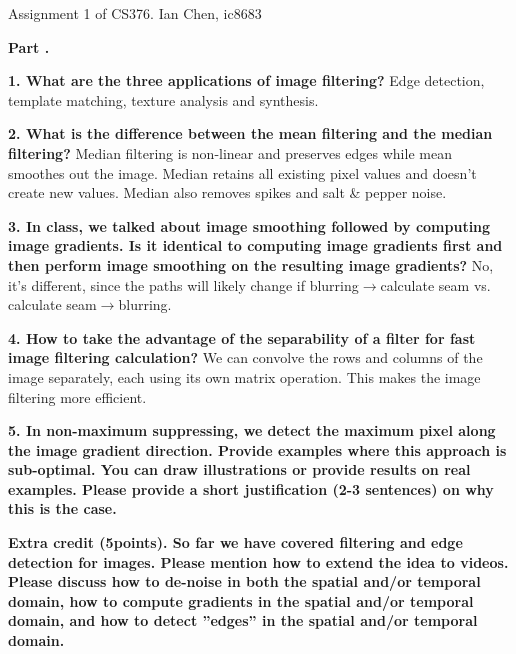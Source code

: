 \documentclass[11pt]{article}
\begin{document}
    Assignment 1 of CS376. Ian Chen, ic8683\newline
    
    \textbf{Part .}\newline

    \textbf{1. What are the three applications of image filtering?}\newline
    Edge detection, template matching, texture analysis and synthesis.\newline

    \textbf{2. What is the difference between the mean filtering and the median filtering?}\newline
    Median filtering is non-linear and preserves edges while mean smoothes out the image.
    Median retains all existing pixel values and doesn’t create new values. Median also removes spikes and salt \& pepper noise.\newline

    \textbf{3. In class, we talked about image smoothing followed by computing image gradients.
    Is it identical to computing image gradients first and then perform image smoothing on the resulting image gradients?}\newline
    No, it’s different, since the paths will likely change if blurring$\rightarrow$calculate seam vs. calculate seam$\rightarrow$blurring.\newline
    
    \textbf{4. How to take the advantage of the separability of a filter for fast image filtering calculation?}\newline
    We can convolve the rows and columns of the image separately, each using its own matrix operation. This makes the image filtering more efficient.\newline

    \textbf{5. In non-maximum suppressing, we detect the maximum pixel along the image gradient direction. Provide examples where this approach is sub-optimal.
    You can draw illustrations or provide results on real examples. Please provide a short justification (2-3 sentences) on why this is the case.}\newline
    
    \textbf{Extra credit (5points). So far we have covered filtering and edge detection for images. Please mention how to extend the idea to videos.
    Please discuss how to de-noise in both the spatial and/or temporal domain, how to compute gradients in the spatial and/or temporal domain,
        and how to detect ”edges” in the spatial and/or temporal domain.}\newline
\end{document}
